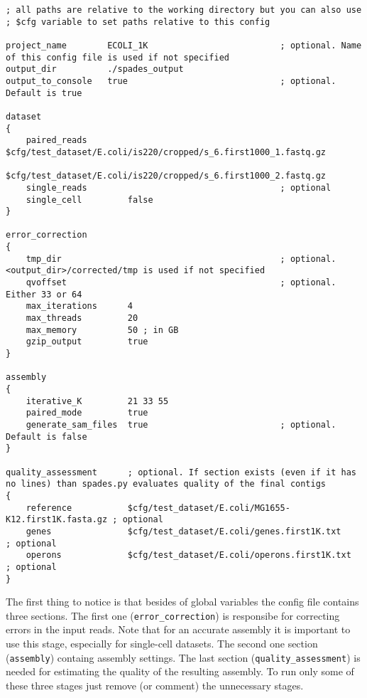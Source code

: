 \documentclass{article}
\def\spades{SPAdes}
\begin{document}
\begin{lstlisting}													
; all paths are relative to the working directory but you can also use 
; $cfg variable to set paths relative to this config

project_name        ECOLI_1K                          ; optional. Name of this config file is used if not specified
output_dir          ./spades_output
output_to_console   true                              ; optional. Default is true

dataset
{
    paired_reads $cfg/test_dataset/E.coli/is220/cropped/s_6.first1000_1.fastq.gz  
                   $cfg/test_dataset/E.coli/is220/cropped/s_6.first1000_2.fastq.gz
    single_reads                                      ; optional
    single_cell         false
}

error_correction
{
    tmp_dir                                           ; optional. <output_dir>/corrected/tmp is used if not specified
    qvoffset                                          ; optional. Either 33 or 64
    max_iterations      4
    max_threads         20
    max_memory          50 ; in GB
    gzip_output         true
}

assembly
{
    iterative_K         21 33 55
    paired_mode         true
    generate_sam_files  true                          ; optional. Default is false
}

quality_assessment      ; optional. If section exists (even if it has no lines) than spades.py evaluates quality of the final contigs
{
    reference           $cfg/test_dataset/E.coli/MG1655-K12.first1K.fasta.gz ; optional
    genes               $cfg/test_dataset/E.coli/genes.first1K.txt           ; optional
    operons             $cfg/test_dataset/E.coli/operons.first1K.txt         ; optional
}
\end{lstlisting}

The first thing to notice is that besides of global variables the config file contains three sections. The first one ({\tt error\_correction}) is responsibe for correcting errors in the input reads.
Note that for an accurate assembly it is important to use this stage, especially
for single-cell datasets.
The second one section ({\tt assembly}) 
containg assembly settings.
The last section ({\tt quality\_assessment})
is needed for estimating the quality of the resulting assembly.
To run only some of these three stages just remove (or comment) the unnecessary stages.

\end{document}
